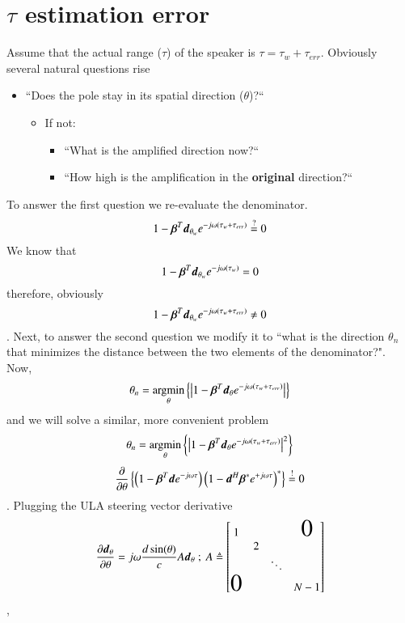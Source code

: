 \section{$ \tau $ estimation error}
Assume that the actual range ($\tau$) of the speaker is $\tau = \tau_{w} + \tau_{err}$. Obviously several natural questions rise
\begin{itemize}
    \item ``Does the pole stay in its spatial direction ($\theta$)?``
    \begin{itemize}
        \item If not: 
        \begin{itemize}
            \item ``What is the amplified direction now?``
            \item ``How high is the amplification in the \textbf{original} direction?`` 
        \end{itemize}
    \end{itemize}
\end{itemize}
To answer the first question we re-evaluate the denominator.
$$ 1-\boldsymbol{\beta}^{T}\boldsymbol{d}_{\theta_{w}}e^{-j\omega (\tau_{w}+\tau_{err})}\stackrel{?}{=}0 $$
We know that
$$ 1-\boldsymbol{\beta}^{T}\boldsymbol{d}_{\theta_{w}}e^{-j\omega (\tau_{w})}=0 $$
therefore, obviously
$$ 1-\boldsymbol{\beta}^{T}\boldsymbol{d}_{\theta_{w}}e^{-j\omega (\tau_{w}+\tau_{err})}\neq0 $$.
Next, to answer the second question we modify it to ``what is the direction $\theta_{n}$ that minimizes the distance between the two elements of the denominator?". Now,
\begin{equation}
    \theta_{n} = 
    \underset{\theta}{\mathrm{argmin}} 
    \left\{\left|
    1-\boldsymbol{\beta}^{T}\boldsymbol{d}_{\theta}e^{-j\omega (\tau_{w}+\tau_{err})}
    \right|
    \right\}
\end{equation}
and we will solve a similar, more convenient problem
$$
\theta_{n} = 
\underset{\theta}{\mathrm{argmin}} 
\left\{\left|
1-\boldsymbol{\beta}^{T}\boldsymbol{d}_{\theta}e^{-j\omega (\tau_{w}+\tau_{err})}
\right|^2
\right\}
$$ 
$$
\frac{\partial}{\partial \theta}
\left\{
\left(
1 - \boldsymbol{\beta}^{T}\boldsymbol{d}e^{-j\omega\tau}
\right)
\left(
1 - \boldsymbol{d}^{H}\boldsymbol{\beta}^{*}e^{+j\omega\tau}
\right)^{*}
\right\} 
\stackrel{!}{=} 0
$$.
Plugging the ULA steering vector derivative
$$
\frac{\partial\vecnot{d}_{\theta}}{\partial \theta}
=
j\omega\frac{d\sin(\theta)}{c}A\vecnot{d}_{\theta}
\ ;\ 
A \triangleq 
\begin{bmatrix}
1                   &       &           &\mbox{\huge{0}}\\
                    &    2  &           &               \\
                    &       &   \ddots  &               \\
\mbox{\huge{0}}     &       &           & N-1           \\
\end{bmatrix}
$$,
